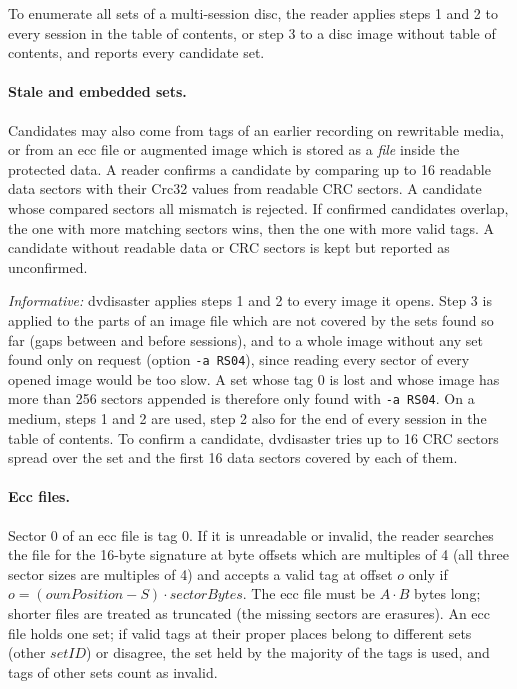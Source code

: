 \medskip

To enumerate all sets of a multi-session disc, the reader applies steps 1
and 2 to every session in the table of contents, or step 3 to a disc image
without table of contents, and reports every candidate set.

\medskip

\paragraph{Stale and embedded sets.} Candidates may also come from tags of
an earlier recording on rewritable media, or from an ecc file or augmented
image which is stored as a {\em file} inside the protected data. A reader
confirms a candidate by comparing up to 16 readable data sectors with their
Crc32 values from readable CRC sectors. A candidate whose compared sectors
all mismatch is rejected. If confirmed candidates overlap, the one with more
matching sectors wins, then the one with more valid tags. A candidate
without readable data or CRC sectors is kept but reported as unconfirmed.

{\em Informative:} dvdisaster applies steps 1 and 2 to every image it
opens. Step 3 is applied to the parts of an image file which are not covered
by the sets found so far (gaps between and before sessions), and to a whole
image without any set found only on request (option {\tt -a RS04}), since
reading every sector of every opened image would be too slow. A set whose
tag 0 is lost and whose image has more than 256 sectors appended is
therefore only found with {\tt -a RS04}. On a medium, steps 1 and 2 are used,
step 2 also for the end of every session in the table of contents.
To confirm a candidate, dvdisaster tries up to 16 CRC sectors spread over
the set and the first 16 data sectors covered by each of them.

\paragraph{Ecc files.} Sector 0 of an ecc file is tag 0. If it is
unreadable or invalid, the reader searches the file for the 16-byte
signature at byte offsets which are multiples of 4 (all three sector sizes
are multiples of 4) and accepts a valid tag at offset $o$ only if
$o = (ownPosition - S) \cdot sectorBytes$. The ecc file must be
$A \cdot B$ bytes long; shorter files are treated as truncated (the missing
sectors are erasures). An ecc file holds one set; if valid tags at their
proper places belong to different sets (other $setID$) or disagree, the set
held by the majority of the tags is used, and tags of other sets count as
invalid.


